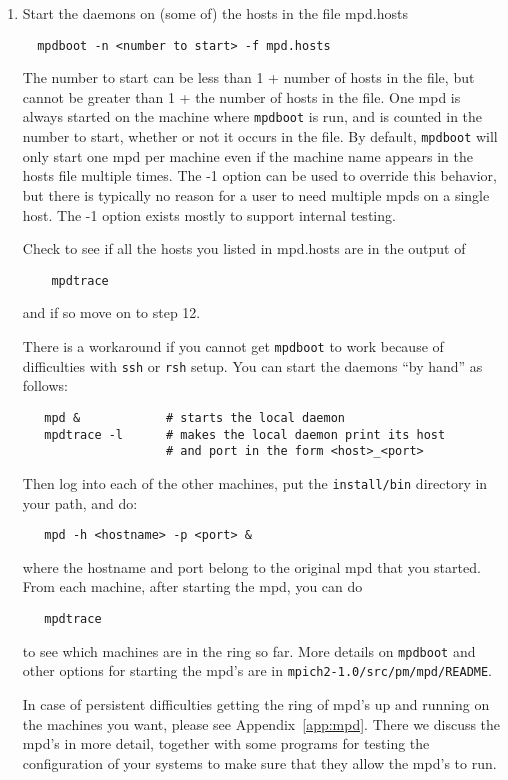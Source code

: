 \documentclass[dvipdfm,11pt]{article}
\begin{document}
\begin{enumerate}
\item
Start the daemons on (some of) the hosts in the file mpd.hosts
\begin{verbatim}
  mpdboot -n <number to start> -f mpd.hosts
\end{verbatim}
The number to start can be less than 1 + number of hosts in the
file, but cannot be greater than 1 + the number of hosts in the
file.  One mpd is always started on the machine where \texttt{mpdboot} is
run, and is counted in the number to start, whether or not it occurs
in the file.  By default, \texttt{mpdboot} will only start one mpd per
machine even if the machine name appears in the hosts file multiple times.
The -1 option can be used to override this behavior, but there is typically
no reason for a user to need multiple mpds on a single host.
The -1 option exists mostly to support internal testing.

Check to see if all the hosts you listed in mpd.hosts are in the output
of 
\begin{verbatim}
    mpdtrace
\end{verbatim}
and if so move on to step 12.

There is a workaround if you cannot get \texttt{mpdboot} to work because of
difficulties with \texttt{ssh} or \texttt{rsh} setup.  You can start the daemons ``by
hand'' as follows:
\begin{verbatim}
   mpd &            # starts the local daemon
   mpdtrace -l      # makes the local daemon print its host
                    # and port in the form <host>_<port>
\end{verbatim}
Then log into each of the other machines, put the \texttt{install/bin}
directory in your path, and do:
\begin{verbatim}
   mpd -h <hostname> -p <port> &
\end{verbatim}
where the hostname and port belong to the original mpd that you
started.  From each machine, after starting the mpd, you can do 
\begin{verbatim}
   mpdtrace
\end{verbatim}
to see which machines are in the ring so far.  More details on
\texttt{mpdboot} and other options for starting the mpd's are in
\texttt{mpich2-1.0/src/pm/mpd/README}.

In case of persistent difficulties getting the ring of mpd's up and
running on the machines you want, please see Appendix~\ref{app:mpd}.
There we discuss the mpd's in more detail, together with some programs
for testing the configuration of your systems to make sure that they
allow the mpd's to run.


\end{enumerate}
\end{document}
